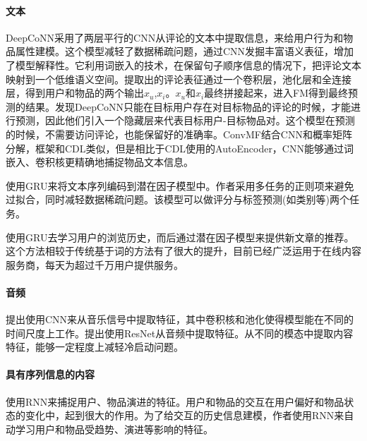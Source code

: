 \paragraph{文本}
DeepCoNN\cite{zheng2017joint}采用了两层平行的CNN从评论的文本中提取信息，来给用户行为和物品属性建模。这个模型减轻了数据稀疏问题，通过CNN发掘丰富语义表征，增加了模型解释性。它利用词嵌入的技术，在保留句子顺序信息的情况下，把评论文本映射到一个低维语义空间。提取出的评论表征通过一个卷积层，池化层和全连接层，得到用户和物品的两个输出$x_u$,$x_i$。$x_u$和$x_i$最终拼接起来，进入FM得到最终预测的结果。\cite{catherine2017transnets}发现DeepCoNN只能在目标用户存在对目标物品的评论的时候，才能进行预测，因此他们引入一个隐藏层来代表目标用户-目标物品对。这个模型在预测的时候，不需要访问评论，也能保留好的准确率。ConvMF\cite{kim2016convolutional}结合CNN和概率矩阵分解，框架和CDL\cite{wang2015collaborative}类似，但是相比于CDL使用的AutoEncoder，CNN能够通过词嵌入、卷积核更精确地捕捉物品文本信息。

\cite{bansal2016ask}使用GRU来将文本序列编码到潜在因子模型中。作者采用多任务的正则项来避免过拟合，同时减轻数据稀疏问题。该模型可以做评分与标签预测(如类别等)两个任务。

\cite{okura2017embedding}使用GRU去学习用户的浏览历史，而后通过潜在因子模型来提供新文章的推荐。这个方法相较于传统基于词的方法有了很大的提升，目前已经广泛运用于在线内容服务商，每天为超过千万用户提供服务。

\paragraph{音频}
\cite{van2013deep}提出使用CNN来从音乐信号中提取特征，其中卷积核和池化使得模型能在不同的时间尺度上工作。\cite{lee2018collaborative}提出使用ResNet从音频中提取特征。从不同的模态中提取内容特征，能够一定程度上减轻冷启动问题。

\paragraph{具有序列信息的内容}
\cite{dai2016recurrent}使用RNN来捕捉用户、物品演进的特征。用户和物品的交互在用户偏好和物品状态的变化中，起到很大的作用。为了给交互的历史信息建模，作者使用RNN来自动学习用户和物品受趋势、演进等影响的特征。

